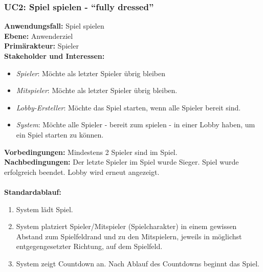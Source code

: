 \documentclass[11pt,ngerman]{article}
\newcommand{\quotes}[1]{``#1''}
\begin{document}
            \subsubsection{UC2: Spiel spielen - \quotes{fully dressed}}
            \label{ssec:UC2Spielspielen}
                \begin{tcolorbox}[enhanced, breakable, sharp corners, width=\dimexpr\textwidth-15mm\relax ,enlarge left by=10mm ,fontupper=\linespread{1.1}\selectfont, boxrule=1pt, title={UC2: Spiel spielen}, colback=white, colframe=gray!22, coltitle=black]

                    \textbf{Anwendungsfall:} Spiel spielen \\
                    \textbf{Ebene:} Anwenderziel \\
                    \textbf{Primärakteur:} Spieler \\
                    \textbf{Stakeholder und Interessen:}
                    \begin{itemize}
                        \item \textit{Spieler}: Möchte als letzter Spieler übrig bleiben
                        \item \textit{Mitspieler}: Möchte als letzter Spieler übrig bleiben.
                        \item \textit{Lobby-Ersteller}:  Möchte das Spiel starten, wenn alle Spieler bereit sind.
                        \item \textit{System}: Möchte alle Spieler - bereit zum spielen - in einer \Gls{Lobby} haben, um ein Spiel starten zu können.
                    \end{itemize}
                    \textbf{Vorbedingungen:} Mindestens 2 Spieler sind im Spiel.\\
                    \textbf{Nachbedingungen:} Der letzte Spieler im Spiel wurde Sieger. Spiel wurde erfolgreich beendet. \Gls{Lobby} wird erneut angezeigt. \\
                   \\  \textbf{Standardablauf:}
                    \begin{enumerate}
                        \item System lädt Spiel.
                        \item System platziert Spieler/Mitspieler (Spielcharakter) in einem gewissen Abstand zum Spielfeldrand und zu den Mitspielern, jeweils in möglichst entgegengesetzter Richtung, auf dem Spielfeld.
                        \item System zeigt Countdown an. Nach Ablauf des Countdowns beginnt das Spiel.

\end{enumerate}
\end{tcolorbox}
\end{document}
